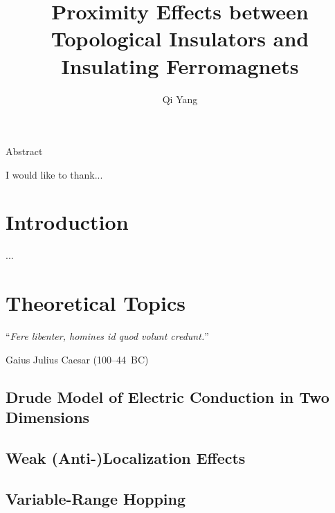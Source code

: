﻿\documentclass{report}
\begin{document}
\title{Proximity Effects between Topological Insulators and Insulating Ferromagnets}
\author{Qi Yang}

\keepXColumns

\beforepreface
%

    Abstract 


    I would like to thank...
\afterpreface

\captionsetup{width=0.95\columnwidth}%
\chapter{Introduction}\label{ch:intro}
    ...

\chapter{Theoretical Topics}\label{ch:theory}
\begin{refsection} 
\epigraph{``\textit{Fere libenter, homines id quod volunt credunt.}''}{Gaius Julius Caesar (100--44~BC)}
    \section{Drude Model of Electric Conduction in Two Dimensions}\label{sec:drude}
        
    \section{Weak (Anti-)Localization Effects}\label{sec:wl}
        
    \section{Variable-Range Hopping}\label{sec:vrh}
        
    \printbibliography[heading=subbibintoc, title=References for Chapter~\thechapter]
\end{refsection}	
\end{document}
